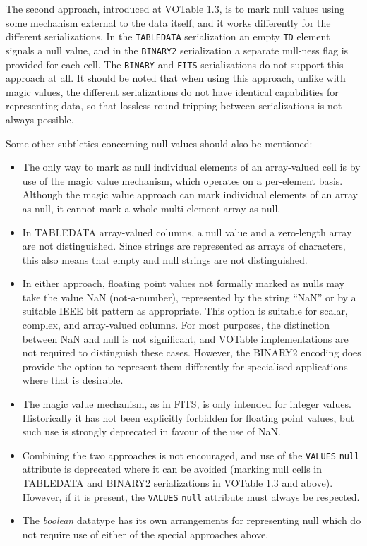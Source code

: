 \documentclass[11pt,a4paper]{ivoa}
\let\fg=\color
\def\attr#1{{\tt{\fg{DarkRed}#1}}}
\def\elem#1{{\tt{\fg{DarkRed}#1}}}
\begin{document}
The second approach, introduced at VOTable 1.3,
is to mark null values using some mechanism external
to the data itself, and it works differently for the different serializations.
In the \elem{TABLEDATA} serialization
an empty \elem{TD} element signals a null value, and
in the \elem{BINARY2} serialization
a separate null-ness flag is provided for each cell.
The \elem{BINARY} and \elem{FITS} serializations do not support this approach
at all.
It should be noted that when using this approach, unlike with magic values,
the different serializations do not have identical capabilities for
representing data, so that lossless round-tripping between serializations
is not always possible.

Some other subtleties concerning null values should also be mentioned:
\begin{itemize}
\item The only way to mark as null individual elements of an array-valued cell
      is by use of the magic value mechanism, which operates on a
      per-element basis.
      Although the magic value approach can mark individual elements
      of an array as null, it cannot mark a whole multi-element array as null.
\item In TABLEDATA array-valued columns, a null value and a zero-length
      array are not distinguished.
      Since strings are represented as arrays of characters, this also
      means that empty and null strings are not distinguished.
\item In either approach, floating point values not formally marked as nulls
      may take the value NaN (not-a-number),
      represented by the string ``NaN'' or by a suitable IEEE bit pattern
      as appropriate.
      This option is suitable for scalar, complex, and array-valued columns.
      For most purposes, the distinction between NaN and null is not
      significant, and VOTable implementations are not required to distinguish
      these cases.  However, the BINARY2 encoding does provide the option
      to represent them differently for specialised applications where
      that is desirable.
\item The magic value mechanism, as in FITS, is only intended for integer
      values.  Historically it has not been explicitly forbidden for
      floating point values, but such use is strongly deprecated in favour
      of the use of NaN.
\item Combining the two approaches is not encouraged,
      and use of the \elem{VALUES} \attr{null} attribute is deprecated
      where it can be avoided (marking null cells in TABLEDATA and BINARY2
      serializations in VOTable 1.3 and above).
      However, if it is present, the \elem{VALUES} \attr{null} attribute
      must always be respected.
\item The {\em boolean} datatype has its own arrangements for representing
      null which do not require use of either of the special approaches above.
\end{itemize}
\end{document}
